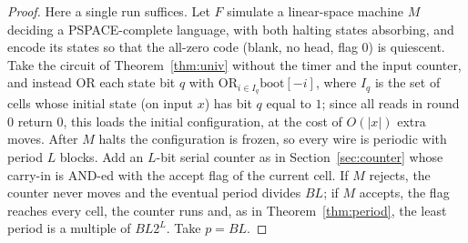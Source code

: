 \begin{proof}
Here a single run suffices.  Let $F$ simulate a linear-space machine $M$ deciding a PSPACE-complete
language, with both halting states absorbing, and encode its states so that the all-zero code
(blank, no head, flag $0$) is quiescent.  Take the circuit of Theorem~\ref{thm:univ} without the timer
and the input counter, and instead OR each state bit $q$ with $\mathrm{OR}_{i\in I_q}\mathrm{boot}[-i]$,
where $I_q$ is the set of cells whose initial state (on input $x$) has bit $q$ equal to $1$; since all
reads in round $0$ return $0$, this loads the initial configuration, at the cost of $O(|x|)$ extra
moves.  After $M$ halts the configuration is frozen, so every wire is periodic with period $L$ blocks.
Add an $L$-bit serial counter as in Section~\ref{sec:counter} whose carry-in is AND-ed with the accept
flag of the current cell.  If $M$ rejects, the counter never moves and the eventual period divides
$BL$; if $M$ accepts, the flag reaches every cell, the counter runs and, as in
Theorem~\ref{thm:period}, the least period is a multiple of $BL2^L$.  Take $p=BL$.
\end{proof}

